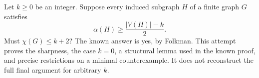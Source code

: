 Let \(k\geq0\) be an integer. Suppose every induced subgraph \(H\) of a finite graph \(G\) satisfies
\[
 \alpha(H)\geq \frac{|V(H)|-k}{2}. \tag{1}
\]
Must \(\chi(G)\leq k+2\)?
The known answer is yes, by Folkman. This attempt proves the sharpness, the case \(k=0\), a structural lemma used in the known proof, and precise restrictions on a minimal counterexample. It does not reconstruct the full final argument for arbitrary \(k\).
